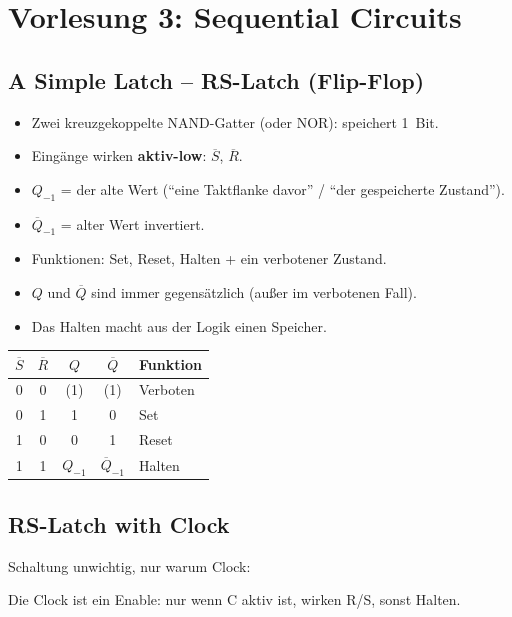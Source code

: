 \documentclass[11pt,a4paper]{article}
\begin{document}
\newpage
\section{Vorlesung 3: Sequential Circuits}

\subsection{A Simple Latch -- RS-Latch (Flip-Flop)}
\begin{itemize}
    \item Zwei kreuzgekoppelte NAND-Gatter (oder NOR): speichert 1~Bit.
    \item Eingänge wirken \textbf{aktiv-low}: $\overline{S}$, $\overline{R}$.
    \item $Q_{-1}$ = der alte Wert (``eine Taktflanke davor'' / ``der gespeicherte Zustand'').
    \item $\overline{Q}_{-1}$ = alter Wert invertiert.
    \item Funktionen: Set, Reset, Halten + ein verbotener Zustand.
    \item $Q$ und $\overline{Q}$ sind immer gegensätzlich (außer im verbotenen Fall).
    \item Das Halten macht aus der Logik einen Speicher.
\end{itemize}
\begin{center}
\begin{tabular}{cc|cc|l}
    \toprule
    $\overline{S}$ & $\overline{R}$ & $Q$ & $\overline{Q}$ & Funktion \\ \midrule
    0 & 0 & (1) & (1) & Verboten \\
    0 & 1 & 1 & 0 & Set \\
    1 & 0 & 0 & 1 & Reset \\
    1 & 1 & $Q_{-1}$ & $\overline{Q}_{-1}$ & Halten \\ \bottomrule
\end{tabular}
\end{center}

\subsection{RS-Latch with Clock}
Schaltung unwichtig, nur warum Clock:

Die Clock ist ein Enable: nur wenn C aktiv ist, wirken R/S, sonst Halten.
\end{document}
